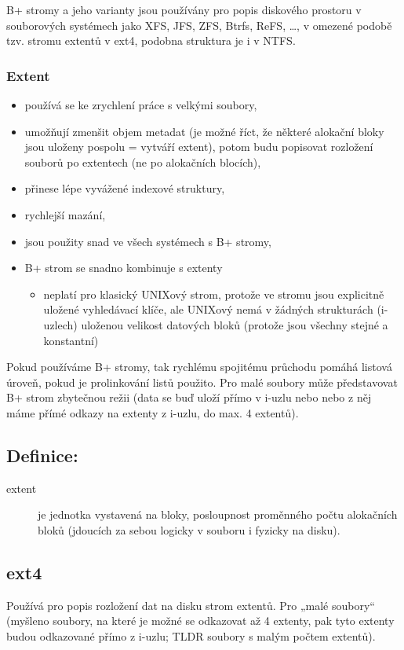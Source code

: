 \documentclass[a4paper, 11pt]{article}
\begin{document}
B+ stromy a jeho varianty jsou používány pro popis diskového prostoru v souborových systémech jako XFS, JFS, ZFS, Btrfs, ReFS, \ldots, v omezené podobě tzv. stromu extentů v ext4, podobna struktura je i v NTFS.

\subsubsection{Extent}
\begin{itemize}
    \item používá se ke zrychlení práce s velkými soubory,
    \item umožňují zmenšit objem metadat (je možné říct, že některé alokační bloky jsou uloženy pospolu = vytváří extent), potom budu popisovat rozložení souborů po extentech (ne po alokačních blocích),
    \item přinese lépe vyvážené indexové struktury,
    \item rychlejší mazání,
    \item jsou použity snad ve všech systémech s B+ stromy,
    \item B+ strom se snadno kombinuje s extenty
    	\begin{itemize}\item neplatí pro klasický UNIXový strom, protože ve stromu jsou explicitně uložené vyhledávací klíče, ale UNIXový nemá v žádných strukturách (i-uzlech) uloženou velikost datových bloků (protože jsou všechny stejné a konstantní)\end{itemize}
\end{itemize}
 
Pokud používáme B+ stromy, tak rychlému spojitému průchodu pomáhá listová úroveň, pokud je prolinkování listů použito. Pro malé soubory může představovat B+ strom zbytečnou režii (data se buď uloží přímo v i-uzlu nebo nebo z něj máme přímé odkazy na extenty z i-uzlu, do max. 4 extentů).
 
\subsection*{Definice:}
\begin{description}
\item[extent] je jednotka vystavená na bloky, posloupnost proměnného počtu alokačních bloků (jdoucích za sebou logicky v souboru i fyzicky na disku).
\end{description}

\newpage

\subsection{ext4}
Používá pro popis rozložení dat na disku strom extentů. Pro „malé soubory“ (myšleno soubory, na které je možné se odkazovat až 4 extenty, pak tyto extenty budou odkazované přímo z i-uzlu; TLDR soubory s malým počtem extentů).
 
\end{document}
